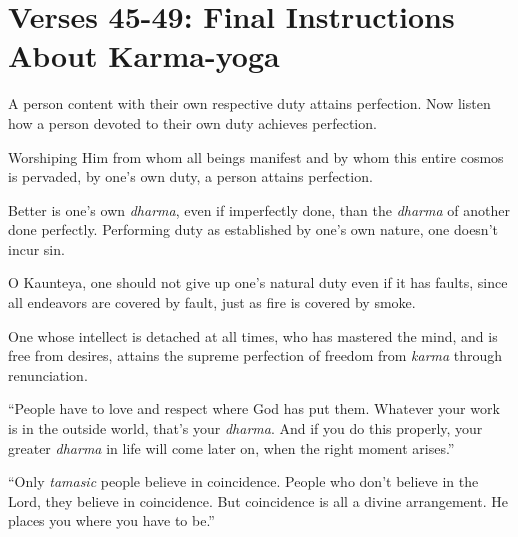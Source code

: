 \section{Verses 45-49: Final Instructions About Karma-yoga}\label{sec-verses-45-49-final-instructions-about-karma-yoga}
{A person content with their own respective duty attains perfection. Now listen how a person devoted to their own duty achieves perfection.}

{Worshiping Him from whom all beings manifest and by whom this entire cosmos is pervaded, by one’s own duty, a person attains perfection.}

{Better is one’s own \textit{dharma}, even if imperfectly done, than the \textit{dharma} of another done perfectly. Performing duty as established by one’s own nature, one doesn't incur sin.}

{O Kaunteya, one should not give up one's natural duty even if it has faults, since all endeavors are covered by fault, just as fire is covered by smoke.}

{One whose intellect is detached at all times, who has mastered the mind, and is free from desires, attains the supreme perfection of freedom from \textit{karma} through renunciation.}


\enquote{People have to love and respect where God has put them. Whatever your work is in the outside world, that’s your \textit{dharma}. And if you do this properly, your greater \textit{dharma} in life will come later on, when the right moment arises.}

\enquote{Only \textit{tamasic} people believe in coincidence. People who don’t believe in the Lord, they believe in coincidence. But coincidence is all a divine arrangement. He places you where you have to be.}

